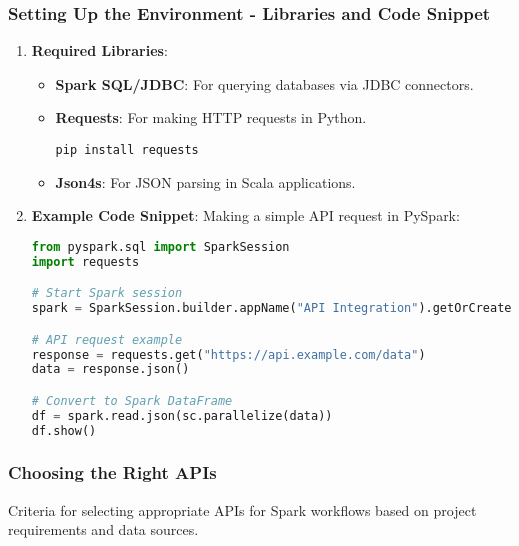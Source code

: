 \documentclass[aspectratio=169]{beamer}
\begin{document}
\begin{frame}[fragile]
    \frametitle{Setting Up the Environment - Libraries and Code Snippet}
    \begin{enumerate}
        \item \textbf{Required Libraries}:
        \begin{itemize}
            \item \textbf{Spark SQL/JDBC}: For querying databases via JDBC connectors.
            \item \textbf{Requests}: For making HTTP requests in Python.
            \begin{lstlisting}
pip install requests
            \end{lstlisting}
            \item \textbf{Json4s}: For JSON parsing in Scala applications.
        \end{itemize}
        
        \item \textbf{Example Code Snippet}:
        Making a simple API request in PySpark:
        \begin{lstlisting}[language=Python]
from pyspark.sql import SparkSession
import requests

# Start Spark session
spark = SparkSession.builder.appName("API Integration").getOrCreate()

# API request example
response = requests.get("https://api.example.com/data")
data = response.json()

# Convert to Spark DataFrame
df = spark.read.json(sc.parallelize(data))
df.show()
        \end{lstlisting}
    \end{enumerate}
\end{frame}

\begin{frame}[fragile]
    \frametitle{Choosing the Right APIs}
    Criteria for selecting appropriate APIs for Spark workflows based on project requirements and data sources.
\end{frame}
\end{document}
